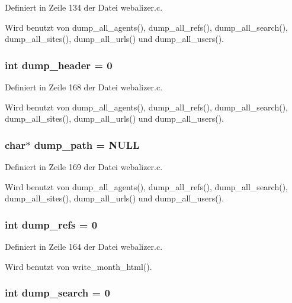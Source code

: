 Definiert in Zeile 134 der Datei webalizer.c.

Wird benutzt von dump\_\-all\_\-agents(), dump\_\-all\_\-refs(), dump\_\-all\_\-search(), dump\_\-all\_\-sites(), dump\_\-all\_\-urls() und dump\_\-all\_\-users().
\subsubsection{\setlength{\rightskip}{0pt plus 5cm}int {\bf dump\_\-header} = 0}\label{webalizer_8c_2a20cc7746e90fec505b066fda4e1f5d}




Definiert in Zeile 168 der Datei webalizer.c.

Wird benutzt von dump\_\-all\_\-agents(), dump\_\-all\_\-refs(), dump\_\-all\_\-search(), dump\_\-all\_\-sites(), dump\_\-all\_\-urls() und dump\_\-all\_\-users().
\subsubsection{\setlength{\rightskip}{0pt plus 5cm}char$\ast$ {\bf dump\_\-path} = NULL}\label{webalizer_8c_10b59e622c5a54e43f7ec491e5bc1776}




Definiert in Zeile 169 der Datei webalizer.c.

Wird benutzt von dump\_\-all\_\-agents(), dump\_\-all\_\-refs(), dump\_\-all\_\-search(), dump\_\-all\_\-sites(), dump\_\-all\_\-urls() und dump\_\-all\_\-users().
\subsubsection{\setlength{\rightskip}{0pt plus 5cm}int {\bf dump\_\-refs} = 0}\label{webalizer_8c_5e125d6b90581ab008f71bf272ec1aac}




Definiert in Zeile 164 der Datei webalizer.c.

Wird benutzt von write\_\-month\_\-html().
\subsubsection{\setlength{\rightskip}{0pt plus 5cm}int {\bf dump\_\-search} = 0}\label{webalizer_8c_5acb64968750f92b0c7443ec44dde282}





